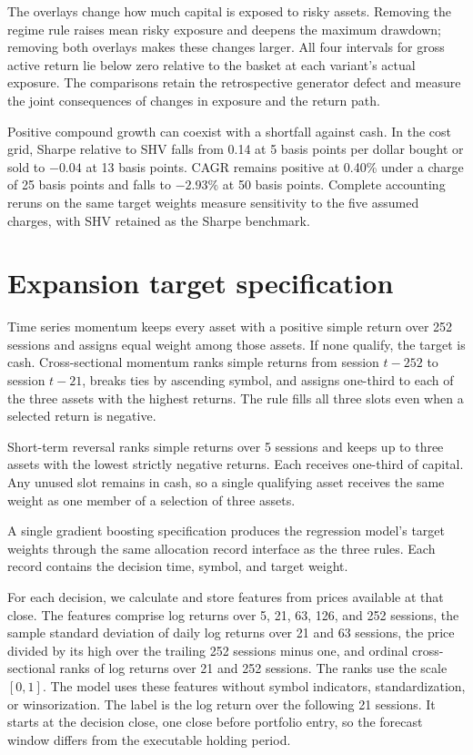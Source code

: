 \documentclass{article}
\begin{document}
The overlays change how much capital is exposed to risky assets. Removing the regime rule raises mean risky exposure and deepens the maximum drawdown; removing both overlays makes these changes larger. All four intervals for gross active return lie below zero relative to the basket at each variant's actual exposure. The comparisons retain the retrospective generator defect and measure the joint consequences of changes in exposure and the return path.

Positive compound growth can coexist with a shortfall against cash. In the cost grid, Sharpe relative to SHV falls from 0.14 at 5 basis points per dollar bought or sold to $-0.04$ at 13 basis points. CAGR remains positive at 0.40\% under a charge of 25 basis points and falls to $-2.93\%$ at 50 basis points. Complete accounting reruns on the same target weights measure sensitivity to the five assumed charges, with SHV retained as the Sharpe benchmark.

\clearpage
\section{Expansion target specification}
\label{app:expansion-targets}

Time series momentum keeps every asset with a positive simple return over 252 sessions and assigns equal weight among those assets. If none qualify, the target is cash. Cross-sectional momentum ranks simple returns from session $t-252$ to session $t-21$, breaks ties by ascending symbol, and assigns one-third to each of the three assets with the highest returns. The rule fills all three slots even when a selected return is negative.

Short-term reversal ranks simple returns over 5 sessions and keeps up to three assets with the lowest strictly negative returns. Each receives one-third of capital. Any unused slot remains in cash, so a single qualifying asset receives the same weight as one member of a selection of three assets.

A single gradient boosting specification produces the regression model's target weights through the same allocation record interface as the three rules. Each record contains the decision time, symbol, and target weight.

For each decision, we calculate and store features from prices available at that close. The features comprise log returns over 5, 21, 63, 126, and 252 sessions, the sample standard deviation of daily log returns over 21 and 63 sessions, the price divided by its high over the trailing 252 sessions minus one, and ordinal cross-sectional ranks of log returns over 21 and 252 sessions. The ranks use the scale $[0,1]$. The model uses these features without symbol indicators, standardization, or winsorization. The label is the log return over the following 21 sessions. It starts at the decision close, one close before portfolio entry, so the forecast window differs from the executable holding period.
\end{document}

